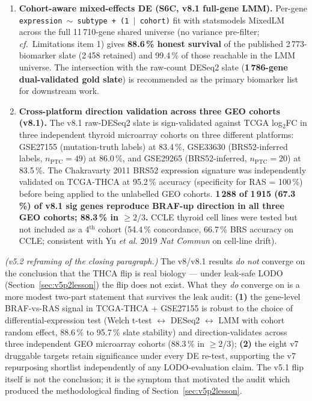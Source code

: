 \documentclass[11pt,a4paper]{article}
\begin{document}
\begin{enumerate}
\item \textbf{Cohort-aware mixed-effects DE (S6C, v8.1 full-gene LMM).} Per-gene \texttt{expression $\sim$ subtype + (1 $|$ cohort)} fit with statsmodels MixedLM across the full 11\,710-gene shared universe (no variance pre-filter; \emph{cf.}~Limitations item 1) gives \textbf{88.6\,\% honest survival} of the published 2\,773-biomarker slate (2\,458 retained) and 99.4\,\% of those reachable in the LMM universe. The intersection with the raw-count DESeq2 slate (\textbf{1\,786-gene dual-validated gold slate}) is recommended as the primary biomarker list for downstream work.
\item \textbf{Cross-platform direction validation across three GEO cohorts (v8.1).} The v8.1 raw-DESeq2 slate is sign-validated against TCGA log$_2$FC in three independent thyroid microarray cohorts on three different platforms: GSE27155 (mutation-truth labels) at 83.4\,\%, GSE33630 (BRS52-inferred labels, $n_{\mathrm{PTC}} = 49$) at 86.0\,\%, and GSE29265 (BRS52-inferred, $n_{\mathrm{PTC}} = 20$) at 83.5\,\%. The Chakravarty 2011 BRS52 expression signature was independently validated on TCGA-THCA at 95.2\,\% accuracy (specificity for RAS = 100\,\%) before being applied to the unlabelled GEO cohorts. \textbf{1\,288 of 1\,915 (67.3\,\%) of v8.1 sig genes reproduce BRAF-up direction in all three GEO cohorts; 88.3\,\% in $\ge 2/3$.} CCLE thyroid cell lines were tested but not included as a 4$^{\mathrm{th}}$ cohort (54.4\,\% concordance, 66.7\,\% BRS accuracy on CCLE; consistent with Yu \emph{et al.} 2019 \emph{Nat Commun} on cell-line drift).
\end{enumerate}
\emph{(v5.2 reframing of the closing paragraph.)} The v8/v8.1 results
\emph{do not} converge on the conclusion that the THCA flip is real
biology --- under leak-safe LODO (Section~\ref{sec:v5p2lesson}) the
flip does not exist. What they \emph{do} converge on is a more
modest two-part statement that survives the leak audit: \textbf{(1)}
the gene-level BRAF-vs-RAS signal in TCGA-THCA + GSE27155 is robust to
the choice of differential-expression test (Welch t-test
$\leftrightarrow$ DESeq2 $\leftrightarrow$ LMM with cohort random
effect, 88.6\,\% to 95.7\,\% slate stability) and direction-validates
across three independent GEO microarray cohorts (88.3\,\% in
$\ge 2/3$); \textbf{(2)} the eight v7 druggable targets retain
significance under every DE re-test, supporting the v7 repurposing
shortlist independently of any LODO-evaluation claim. The v5.1 flip
itself is not the conclusion; it is the symptom that motivated the
audit which produced the methodological finding of
Section~\ref{sec:v5p2lesson}.
\end{document}
